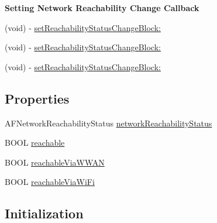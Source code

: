 \begin{Indent}\textbf{ Setting Network Reachability Change Callback}\par
{\em 

 

 }\begin{DoxyCompactItemize}
\item 
(void) -\/ \mbox{\hyperlink{interface_a_f_network_reachability_manager_ad0cbd4cc75749ec8e6ee383b91ae51bd}{set\+Reachability\+Status\+Change\+Block\+:}}
\item 
(void) -\/ \mbox{\hyperlink{interface_a_f_network_reachability_manager_ad0cbd4cc75749ec8e6ee383b91ae51bd}{set\+Reachability\+Status\+Change\+Block\+:}}
\item 
(void) -\/ \mbox{\hyperlink{interface_a_f_network_reachability_manager_ad0cbd4cc75749ec8e6ee383b91ae51bd}{set\+Reachability\+Status\+Change\+Block\+:}}
\end{DoxyCompactItemize}
\end{Indent}
\subsection*{Properties}
\begin{DoxyCompactItemize}
\item 
A\+F\+Network\+Reachability\+Status \mbox{\hyperlink{interface_a_f_network_reachability_manager_a4de1790d27df4c6a3586d3961d9c7b77}{network\+Reachability\+Status}}
\item 
B\+O\+OL \mbox{\hyperlink{interface_a_f_network_reachability_manager_a9c2f8249d282f08b770172b86d021983}{reachable}}
\item 
B\+O\+OL \mbox{\hyperlink{interface_a_f_network_reachability_manager_a3bf818f1daba31c4b15949679d348025}{reachable\+Via\+W\+W\+AN}}
\item 
B\+O\+OL \mbox{\hyperlink{interface_a_f_network_reachability_manager_a8ada1e526c4f63340a2f893fe4b4e947}{reachable\+Via\+Wi\+Fi}}
\end{DoxyCompactItemize}
\subsection*{Initialization}
\label{_amgrp61bcd96a2c1f8026527cbf2019d6e9a4}%


 


